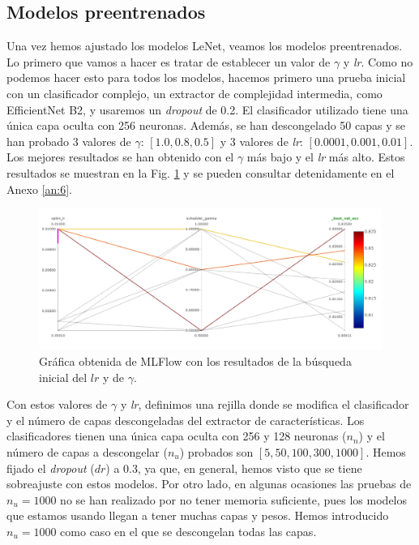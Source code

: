 \documentclass[a4paper,12pt,oneside,titlepage]{book}
\begin{document}
\subsection*{Modelos preentrenados}

Una vez hemos ajustado los modelos LeNet, veamos los modelos preentrenados. Lo primero que vamos a hacer es tratar de establecer un valor de $\gamma$ y \textit{lr}. Como no podemos hacer esto para todos los modelos, hacemos primero una prueba inicial con un clasificador complejo, un extractor de complejidad intermedia, como EfficientNet B2, y usaremos un \textit{dropout} de 0.2. El clasificador utilizado tiene una única capa oculta con 256 neuronas. Además, se han descongelado 50 capas y se han probado 3 valores de $\gamma$: $\left[1.0, 0.8, 0.5\right]$ y 3 valores de \textit{lr}: $\left[0.0001, 0.001, 0.01\right]$. Los mejores resultados se han obtenido con el $\gamma$ más bajo y el \textit{lr} más alto. Estos resultados se muestran en la Fig. \ref{fig:studio_optim} y se pueden consultar detenidamente en el Anexo \ref{an:6}.
 
\begin{figure}[h!]
  \centering
  \includegraphics[scale=0.65, center]{studio_optim_pre.png}
  \caption{Gráfica obtenida de MLFlow con los resultados de la búsqueda inicial del $lr$ y de $\gamma$.}
  \label{fig:studio_optim}
\end{figure}

Con estos valores de $\gamma$ y \textit{lr}, definimos una rejilla donde se modifica el clasificador y el número de capas descongeladas del extractor de características. Los clasificadores tienen una única capa oculta con 256 y 128 neuronas ($n_n$) y el número de capas a descongelar ($n_u$) probados son $\left[5, 50, 100, 300, 1000 \right]$. Hemos fijado el \textit{dropout} ($dr$) a 0.3, ya que, en general, hemos visto que se tiene sobreajuste con estos modelos. Por otro lado, en algunas ocasiones las pruebas de $n_u = 1000$ no se han realizado por no tener memoria suficiente, pues los modelos que estamos usando llegan a tener muchas capas y pesos. Hemos introducido $n_u=1000$ como caso en el que se descongelan todas las capas.  
 
\end{document}
